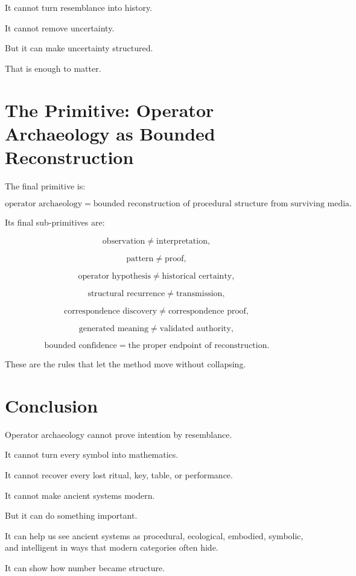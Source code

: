 \documentclass[11pt]{book}
\begin{document}
It cannot turn resemblance into history.

It cannot remove uncertainty.

But it can make uncertainty structured.

That is enough to matter.

\section{The Primitive: Operator Archaeology as Bounded Reconstruction}

The final primitive is:

\[
\text{operator archaeology} = \text{bounded reconstruction of procedural structure from surviving media}.
\]

Its final sub-primitives are:

\[
\text{observation} \neq \text{interpretation},
\]

\[
\text{pattern} \neq \text{proof},
\]

\[
\text{operator hypothesis} \neq \text{historical certainty},
\]

\[
\text{structural recurrence} \neq \text{transmission},
\]

\[
\text{correspondence discovery} \neq \text{correspondence proof},
\]

\[
\text{generated meaning} \neq \text{validated authority},
\]

\[
\text{bounded confidence} = \text{the proper endpoint of reconstruction}.
\]

These are the rules that let the method move without collapsing.

\section{Conclusion}

Operator archaeology cannot prove intention by resemblance.

It cannot turn every symbol into mathematics.

It cannot recover every lost ritual, key, table, or performance.

It cannot make ancient systems modern.

But it can do something important.

It can help us see ancient systems as procedural, ecological, embodied, symbolic, and intelligent in ways that modern categories often hide.

It can show how number became structure.
\end{document}
